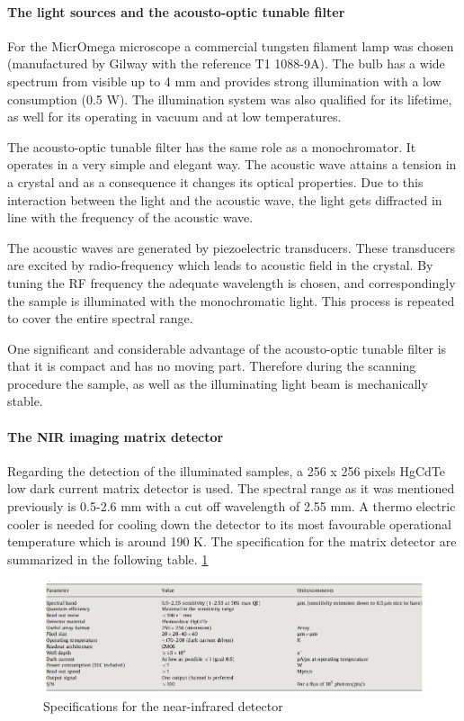 \paragraph{The light sources and the acousto-optic tunable filter}

For the MicrOmega microscope a commercial tungsten filament lamp was chosen (manufactured by Gilway with the reference T1 1088-9A). The bulb has a wide spectrum from visible up to 4 mm and provides strong illumination with a low consumption (0.5 W). The illumination system was also qualified for its lifetime, as well for its operating in vacuum and at low temperatures.

The acousto-optic tunable filter has the same role as a monochromator. It operates in a very simple and elegant way. The acoustic wave attains a tension in a crystal and as a consequence it changes its optical properties. Due to this interaction between the light and the acoustic wave, the light gets diffracted in line with the frequency of the acoustic wave.

The acoustic waves are generated by piezoelectric transducers. These transducers are excited by radio-frequency which leads to acoustic field in the crystal. By tuning the RF frequency the adequate wavelength is chosen, and correspondingly the sample is illuminated with the monochromatic light. This process is repeated to cover the entire spectral range.

One significant and considerable advantage of the acousto-optic tunable filter is that it is compact and has no moving part. Therefore during the scanning procedure the sample, as well as the illuminating light beam is mechanically stable.

\paragraph{The NIR imaging matrix detector}
Regarding the detection of the illuminated samples, a 256 x 256 pixels HgCdTe low dark current matrix detector is used. The spectral range as it was mentioned previously is 0.5-2.6 mm with a cut off wavelength of 2.55 mm.
A thermo electric cooler is needed for cooling down the detector to its most favourable operational temperature which is around 190 K. The specification for the matrix detector are summarized in the following table.
\ref{fig:Specs_for_NIR_detector_MicrOmega}

\begin{figure}[htb]
  \centering
  \includegraphics[scale=0.6]{figures/BFfig/Specs_for_NIR_detector_MicrOmega}
  \caption{Specifications for the near-infrared detector}
  \label{fig:Specs_for_NIR_detector_MicrOmega}
\end{figure}



